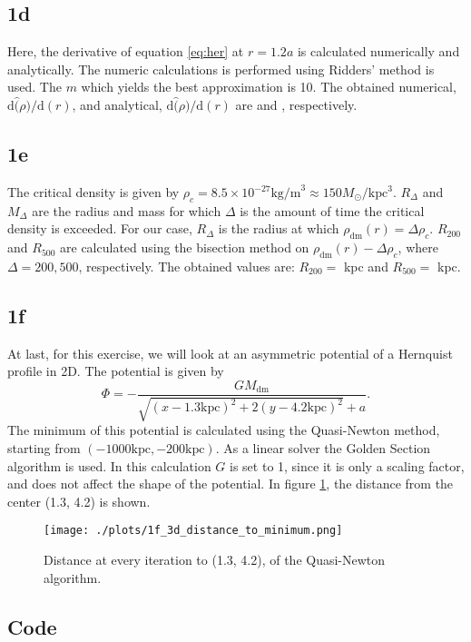 \subsection*{1d}
Here, the derivative of equation \ref{eq:her} at $r=1.2a$ is calculated numerically and analytically. The numeric calculations is performed using Ridders' method is used. The $m$ which yields the best approximation is 10. The obtained numerical, $\mathrm{d}\hat(\rho)/\mathrm{d}(r)$, and analytical, $\mathrm{d}\hat(\rho)/\mathrm{d}(r)$ are  and , respectively.

\subsection*{1e}
The critical density is given by $\rho_c = 8.5 \times 10^{-27} \mathrm{kg/m}^3 \approx 150 M_\odot/\mathrm{kpc}^3$. $R_\Delta$ and $M_\Delta$ are the radius and mass for which $\Delta$ is the amount of time the critical density is exceeded. For our case, $R_\Delta$ is the radius at which $\rho_\mathrm{dm}(r) = \Delta\rho_c$. $R_{200}$ and $R_{500}$ are calculated using the bisection method on $\rho_\mathrm{dm}(r) - \Delta\rho_c$, where $\Delta = 200, 500$, respectively. The obtained values are: $R_{200} = $ kpc and $R_{500} = $ kpc.

\subsection*{1f}
At last, for this exercise, we will look at an asymmetric potential of a Hernquist profile in 2D. The potential is given by
\begin{equation}
  \Phi = - \frac{GM_\mathrm{dm}}{\sqrt{(x-1.3\mathrm{kpc})^2 + 2(y-4.2\mathrm{kpc})^2}+a}.
\end{equation}
The minimum of this potential is calculated using the Quasi-Newton method, starting from $(-1000 \mathrm{kpc}, -200\mathrm{kpc})$. As a linear solver the Golden Section algorithm is used. In this calculation $G$ is set to 1, since it is only a scaling factor, and does not affect the shape of the potential. In figure \ref{fig:1f}, the distance from the center (1.3, 4.2) is shown.

\begin{figure}[!ht]
  \centering
  \texttt{[image: ./plots/1f\_3d\_distance\_to\_minimum.png]}
  \caption{Distance at every iteration to (1.3, 4.2), of the Quasi-Newton algorithm.}
  \label{fig:1f}
\end{figure}


\pagebreak

\subsection*{Code}



\newpage
